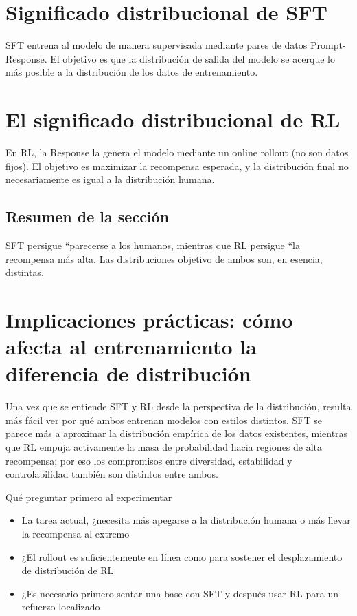 \documentclass[a4paper]{article}
\begin{document}
\section{Significado distribucional de SFT}
SFT entrena al modelo de manera supervisada mediante pares de datos Prompt-Response. El objetivo es que la distribución de salida del modelo se acerque lo más posible a la distribución de los datos de entrenamiento.

\section{El significado distribucional de RL}
En RL, la Response la genera el modelo mediante un online rollout (no son datos fijos). El objetivo es maximizar la recompensa esperada, y la distribución final no necesariamente es igual a la distribución humana.

\subsection{Resumen de la sección}
SFT persigue ``parecerse a los humanos, mientras que RL persigue ``la recompensa más alta. Las distribuciones objetivo de ambos son, en esencia, distintas.

\newpage
\section{Implicaciones prácticas: cómo afecta al entrenamiento la diferencia de distribución}
Una vez que se entiende SFT y RL desde la perspectiva de la distribución, resulta más fácil ver por qué ambos entrenan modelos con estilos distintos. SFT se parece más a aproximar la distribución empírica de los datos existentes, mientras que RL empuja activamente la masa de probabilidad hacia regiones de alta recompensa; por eso los compromisos entre diversidad, estabilidad y controlabilidad también son distintos entre ambos.

\begin{knowledgebox}{Qué preguntar primero al experimentar}
\begin{itemize}
  \item La tarea actual, ¿necesita más apegarse a la distribución humana o más llevar la recompensa al extremo
  \item ¿El rollout es suficientemente en línea como para sostener el desplazamiento de distribución de RL
  \item ¿Es necesario primero sentar una base con SFT y después usar RL para un refuerzo localizado
\end{itemize}
\end{knowledgebox}
\end{document}
